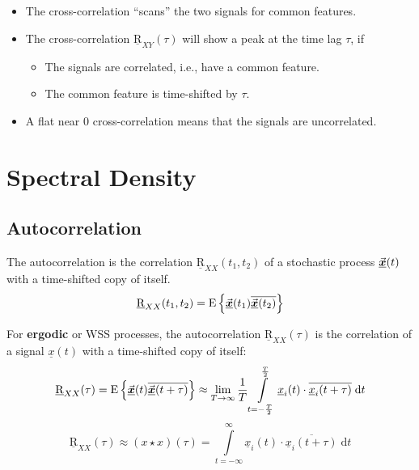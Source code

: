 \begin{refsection}
\begin{itemize}
	\item The cross-correlation ``scans'' the two signals for common features.
	\item The cross-correlation $\underline{\mathrm{R}}_{XY}(\tau)$ will show a peak at the time lag $\tau$, if
	\begin{itemize}
		\item The signals are correlated, i.e., have a common feature.
		\item The common feature is time-shifted by $\tau$.
	\end{itemize}
	\item A flat near $0$ cross-correlation means that the signals are uncorrelated.
\end{itemize}

\section{Spectral Density}

\subsection{Autocorrelation}

The autocorrelation is the correlation $\underline{\mathrm{R}}_{XX}(t_1, t_2)$ of a stochastic process $\vec{\bm{\underline{x}}}(t)$ with a time-shifted copy of itself.
\begin{equation}
	\underline{\mathrm{R}}_{XX}(t_1, t_2) = \mathrm{E}\left\{ \vec{\bm{\underline{x}}}(t_1) \overline{\vec{\bm{\underline{x}}}(t_2)} \right\}
\end{equation}

For \textbf{ergodic} or \ac{WSS} processes, the autocorrelation $\underline{\mathrm{R}}_{XX}(\tau)$ is the correlation of a signal $\underline{x}(t)$ with a time-shifted copy of itself:
\begin{equation}
	\underline{\mathrm{R}}_{XX}(\tau) = \mathrm{E}\left\{ \vec{\bm{\underline{x}}}(t) \overline{\vec{\bm{\underline{x}}}(t+\tau)} \right\} \approx \lim\limits_{T \rightarrow \infty} \frac{1}{T} \int\limits_{t = -\frac{T}{2}}^{\frac{T}{2}} \underline{x}_i(t) \cdot \overline{\underline{x}_i(t+\tau)} \; \mathrm{d} t
\end{equation}
\begin{equation}
	\underline{\mathrm{R}}_{XX}(\tau) \approx \left(x \star x\right)(\tau) = \int\limits_{t = -\infty}^{\infty} \underline{x}_i(t) \cdot \overline{\underline{x}_i(t+\tau)} \; \mathrm{d} t
\end{equation}


\end{refsection}
